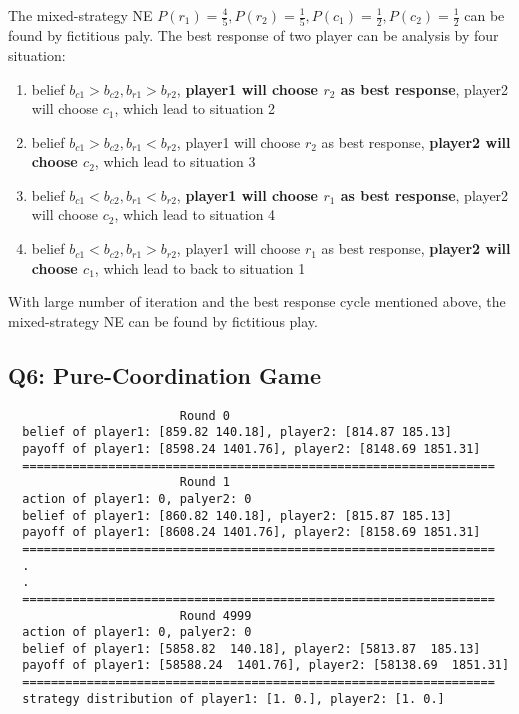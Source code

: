 \documentclass[a4paper, oneside, final, 12pt]{scrartcl} %
\begin{document}
\begingroup
\raggedright
The mixed-strategy NE $P(r_1) = \frac{4}{5}, P(r_2) = \frac{1}{5}, 
P(c_1) = \frac{1}{2}, P(c_2) = \frac{1}{2}$ can be found by fictitious paly.
The best response of two player can be analysis by four situation:

\newpage

\begin{enumerate}
  \item belief $b_{c1} > b_{c2}, b_{r1} > b_{r2}$, 
  \textbf{player1 will choose $r_2$ as best response}, player2 will choose $c_1$, 
  which lead to situation 2
  \item belief $b_{c1} > b_{c2}, b_{r1} < b_{r2}$,
  player1 will choose $r_2$ as best response, \textbf{player2 will choose $c_2$}, 
  which lead to situation 3
  \item belief $b_{c1} < b_{c2}, b_{r1} < b_{r2}$,
  \textbf{player1 will choose $r_1$ as best response}, player2 will choose $c_2$, 
  which lead to situation 4
  \item belief $b_{c1} < b_{c2}, b_{r1} > b_{r2}$,
  player1 will choose $r_1$ as best response, \textbf{player2 will choose $c_1$}, 
  which lead to back to situation 1
\end{enumerate}
With large number of iteration and the best response cycle mentioned above, 
the mixed-strategy NE can be found by fictitious play.
\endgroup

\subsection{Q6: Pure-Coordination Game}

\begin{lstlisting}
                        Round 0
  belief of player1: [859.82 140.18], player2: [814.87 185.13]
  payoff of player1: [8598.24 1401.76], player2: [8148.69 1851.31]
  ==================================================================
                        Round 1
  action of player1: 0, palyer2: 0
  belief of player1: [860.82 140.18], player2: [815.87 185.13]
  payoff of player1: [8608.24 1401.76], player2: [8158.69 1851.31]
  ==================================================================
  .
  .
  ==================================================================
                        Round 4999
  action of player1: 0, palyer2: 0
  belief of player1: [5858.82  140.18], player2: [5813.87  185.13]
  payoff of player1: [58588.24  1401.76], player2: [58138.69  1851.31]
  ==================================================================
  strategy distribution of player1: [1. 0.], player2: [1. 0.]
\end{lstlisting}
\end{document}
